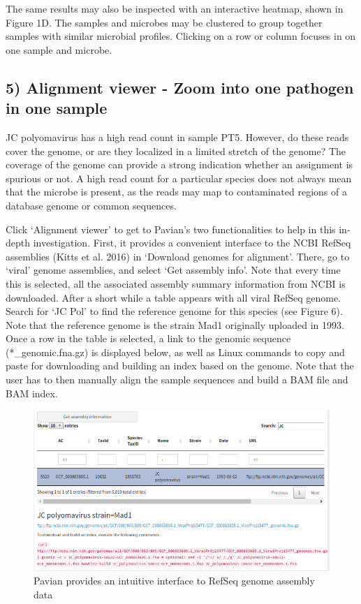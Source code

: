 \documentclass[]{article}
\begin{document}
The same results may also be inspected with an interactive heatmap,
shown in Figure 1D. The samples and microbes may be clustered to group
together samples with similar microbial profiles. Clicking on a row or
column focuses in on one sample and microbe.

\clearpage

\subsection{5) Alignment viewer - Zoom into one pathogen in one
sample}\label{alignment-viewer---zoom-into-one-pathogen-in-one-sample}

JC polyomavirus has a high read count in sample PT5. However, do these
reads cover the genome, or are they localized in a limited stretch of
the genome? The coverage of the genome can provide a strong indication
whether an assignment is spurious or not. A high read count for a
particular species does not always mean that the microbe is present, as
the reads may map to contaminated regions of a database genome or common
sequences.

Click `Alignment viewer' to get to Pavian's two functionalities to help
in this in-depth investigation. First, it provides a convenient
interface to the NCBI RefSeq assemblies (Kitts et al. 2016) in `Download
genomes for alignment'. There, go to `viral' genome assemblies, and
select `Get assembly info'. Note that every time this is selected, all
the associated assembly summary information from NCBI is downloaded.
After a short while a table appears with all viral RefSeq genome. Search
for `JC Pol' to find the reference genome for this species (see Figure
6). Note that the reference genome is the strain Mad1 originally
uploaded in 1993. Once a row in the table is selected, a link to the
genomic sequence (*\_genomic.fna.gz) is displayed below, as well as
Linux commands to copy and paste for downloading and building an index
based on the genome. Note that the user has to then manually align the
sample sequences and build a BAM file and BAM index.

\begin{figure}[htbp]
\centering
\includegraphics{download-genome-jcv.png}
\caption{Pavian provides an intuitive interface to RefSeq genome
assembly data}
\end{figure}
\end{document}
